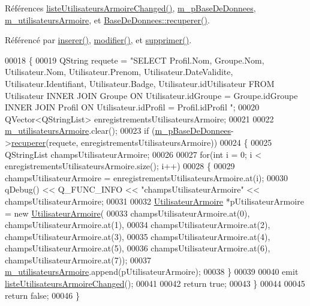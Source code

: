Références \hyperlink{class_utilisateurs_armoire_ac65c676a1c55c1e04732647188c4ad5b}{liste\+Utilisateurs\+Armoire\+Changed()}, \hyperlink{class_utilisateurs_armoire_ac43b4894f5036117d044ad2d22b09318}{m\+\_\+p\+Base\+De\+Donnees}, \hyperlink{class_utilisateurs_armoire_aade1e94417c9729b9e8cadaf19e3227d}{m\+\_\+utilisateurs\+Armoire}, et \hyperlink{class_base_de_donnees_a77539baad389f5acf754cd2cd452403e}{Base\+De\+Donnees\+::recuperer()}.



Référencé par \hyperlink{class_utilisateurs_armoire_a773bfde7c49dac8fa2c8a1c9a43592c0}{inserer()}, \hyperlink{class_utilisateurs_armoire_affd91d7591d57b8dafc098f09b9319aa}{modifier()}, et \hyperlink{class_utilisateurs_armoire_a035d7ca496ddaaf83467934fbd694883}{supprimer()}.


\begin{DoxyCode}
00018 \{
00019     QString requete = \textcolor{stringliteral}{"SELECT Profil.Nom, Groupe.Nom, Utilisateur.Nom, Utilisateur.Prenom,
       Utilisateur.DateValidite, Utilisateur.Identifiant, Utilisateur.Badge, Utilisateur.idUtilisateur FROM Utilisateur INNER JOIN
       Groupe ON Utilisateur.idGroupe = Groupe.idGroupe INNER JOIN Profil ON Utilisateur.idProfil = Profil.idProfil
      "};
00020     QVector<QStringList> enregistrementsUtilisateursArmoire;
00021 
00022     \hyperlink{class_utilisateurs_armoire_aade1e94417c9729b9e8cadaf19e3227d}{m\_utilisateursArmoire}.clear();
00023     \textcolor{keywordflow}{if} (\hyperlink{class_utilisateurs_armoire_ac43b4894f5036117d044ad2d22b09318}{m\_pBaseDeDonnees}->\hyperlink{class_base_de_donnees_a77539baad389f5acf754cd2cd452403e}{recuperer}(requete, enregistrementsUtilisateursArmoire))
00024     \{
00025         QStringList champsUtilisateurArmoire;
00026 
00027         \textcolor{keywordflow}{for}(\textcolor{keywordtype}{int} i = 0; i < enregistrementsUtilisateursArmoire.size(); i++)
00028         \{
00029             champsUtilisateurArmoire = enregistrementsUtilisateursArmoire.at(i);
00030             qDebug() << Q\_FUNC\_INFO << \textcolor{stringliteral}{"champsUtilisateurArmoire"} << champsUtilisateurArmoire;
00031 
00032             \hyperlink{class_utilisateur_armoire}{UtilisateurArmoire} *pUtilisateurArmoire = \textcolor{keyword}{new} 
      \hyperlink{class_utilisateur_armoire}{UtilisateurArmoire}(
00033                         champsUtilisateurArmoire.at(0), champsUtilisateurArmoire.at(1),
00034                         champsUtilisateurArmoire.at(2), champsUtilisateurArmoire.at(3),
00035                         champsUtilisateurArmoire.at(4), champsUtilisateurArmoire.at(5),
00036                         champsUtilisateurArmoire.at(6), champsUtilisateurArmoire.at(7));
00037             \hyperlink{class_utilisateurs_armoire_aade1e94417c9729b9e8cadaf19e3227d}{m\_utilisateursArmoire}.append(pUtilisateurArmoire);
00038         \}
00039 
00040         emit \hyperlink{class_utilisateurs_armoire_ac65c676a1c55c1e04732647188c4ad5b}{listeUtilisateursArmoireChanged}();
00041 
00042         \textcolor{keywordflow}{return} \textcolor{keyword}{true};
00043     \}
00044 
00045     \textcolor{keywordflow}{return} \textcolor{keyword}{false};
00046 \}
\end{DoxyCode}
